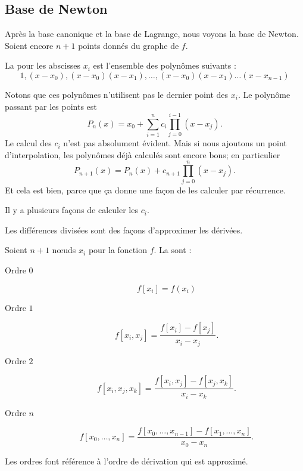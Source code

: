 \subsection{Base de Newton}

Après la base canonique et la base de Lagrange, nous voyons la base de Newton. Soient encore \( n+1\) points donnés du graphe de \( f\).

\begin{definition}
	La  pour les abscisses \( x_i\) est l'ensemble des polynômes suivants :
	\begin{equation}
		1,(x-x_0),(x-x_0)(x-x_1),\ldots,(x-x_0)(x-x_1)\ldots (x-x_{n-1})
	\end{equation}
\end{definition}
Notons que ces polynômes n'utilisent pas le dernier point des \( x_i\). Le polynôme passant par les points est
\begin{equation}
	P_n(x)=x_0+\sum_{i=1}^nc_i\prod_{j=0}^{i-1}(x-x_j).
\end{equation}
Le calcul des \( c_i\) n'est pas absolument évident. Mais si nous ajoutons un point d'interpolation, les polynômes déjà calculés sont encore bons; en particulier
\begin{equation}
	P_{n+1}(x)=P_n(x)+c_{n+1}\prod_{j=0}^{n}(x-x_j).
\end{equation}
Et cela est bien, parce que ça donne une façon de les calculer par récurrence.

Il y a plusieurs façons de calculer les \( c_i\).

Les différences divisées sont des façons d'approximer les dérivées.
\begin{definition}
	Soient \( n+1\) nœuds \( x_i\) pour la fonction \( f\). La  sont :
	\begin{description}
		\item[Ordre \( 0\)]
			\begin{equation}
				f[x_i]=f(x_i)
			\end{equation}
		\item[Ordre \( 1\)]
			\begin{equation}
				f[x_i,x_j]=\frac{ f[x_i]-f[x_j] }{ x_i-x_j }.
			\end{equation}
		\item[Ordre \( 2\)]
			\begin{equation}
				f[x_i,x_j,x_k]=\frac{ f[x_i,x_j]-f[x_j,x_k] }{ x_i-x_k }.
			\end{equation}
		\item[Ordre \( n\)]
			\begin{equation}
				f[x_0,\ldots, x_n]=\frac{ f[x_0,\ldots, x_{n-1}]-f[x_1,\ldots, x_n] }{ x_0-x_n }.
			\end{equation}
	\end{description}
\end{definition}
Les ordres font référence à l'ordre de dérivation qui est approximé.

